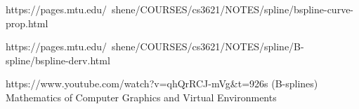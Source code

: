 https://pages.mtu.edu/~shene/COURSES/cs3621/NOTES/spline/bspline-curve-prop.html

https://pages.mtu.edu/~shene/COURSES/cs3621/NOTES/spline/B-spline/bspline-derv.html

https://www.youtube.com/watch?v=qhQrRCJ-mVg&t=926s (B-splines)
Mathematics of Computer Graphics and Virtual Environments
